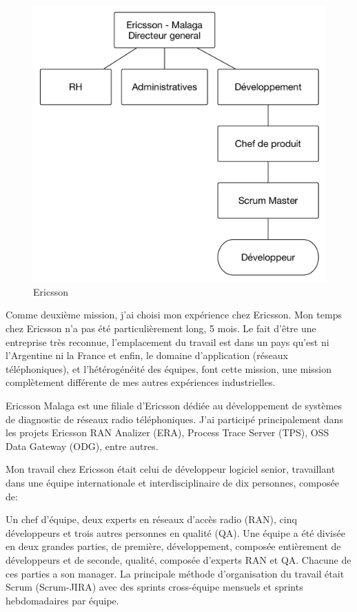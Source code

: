\documentclass{resume} %
\begin{document}
 \begin{figure}[!htp]
 \begin{center}
 \includegraphics[width=0.50\linewidth]{ericsson.pdf}
 \caption{Ericsson}
 \end{center}
 \end{figure}

Comme deuxième mission, j'ai choisi mon expérience chez Ericsson.
Mon temps chez Ericsson n'a pas été particulièrement long, 5 mois. Le fait d'être une entreprise tr\`es reconnue,  l'emplacement du travail est dans un pays qu'est ni l'Argentine ni la France et enfin,  le domaine d'application (réseaux téléphoniques), et l'hétérogénéité des équipes, font cette mission, une mission complètement différente de mes autres expériences industrielles.

Ericsson Malaga est une filiale d'Ericsson dédiée au développement de systèmes de diagnostic de réseaux radio téléphoniques.
J'ai participé principalement dans les projets Ericsson RAN \footnotemark Analizer  (ERA), Process Trace Server (TPS), OSS Data Gateway (ODG), entre autres. 


Mon travail chez Ericsson était celui de développeur logiciel senior, travaillant dans une équipe internationale et interdisciplinaire de dix personnes, composée de:

Un chef d'équipe, deux experts en réseaux d'accès radio (RAN), cinq développeurs et trois autres personnes en qualité (QA).
Une équipe a été divisée en deux grandes parties, de première, développement, composée entièrement de développeurs et de seconde, qualité, composée d'experts RAN et QA. Chacune de ces parties a son manager.
La principale méthode d'organisation du travail était Scrum (Scrum-JIRA) avec des sprints cross-\'equipe mensuels et sprints hebdomadaires par équipe. 
\end{document}
